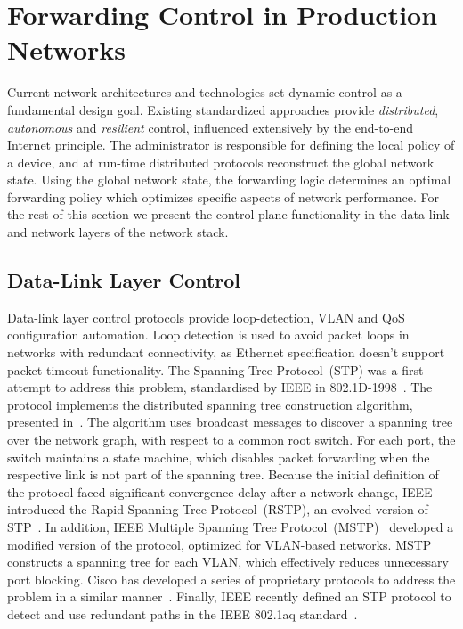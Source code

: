 \section{Forwarding Control in Production Networks} \label{sec:background:netcontrol}

Current network architectures and technologies set dynamic control as a
fundamental design goal.  Existing standardized approaches provide
\textit{distributed}, \textit{autonomous} and \textit{resilient} control,
influenced extensively by the end-to-end Internet principle. The administrator
is responsible for defining the local policy of a device, and at run-time
distributed protocols reconstruct the global network state.  Using the global
network state, the forwarding logic determines an optimal forwarding policy
which optimizes specific aspects of network performance.  For the rest of this
section we present the control plane functionality in the data-link and network
layers of the network stack. 

\subsection{Data-Link Layer Control}

Data-link layer control protocols provide loop-detection, VLAN and QoS
configuration automation. Loop detection is used to avoid packet loops in
networks with redundant connectivity, as Ethernet specification doesn't
support packet timeout functionality.  The Spanning Tree Protocol~(STP) was a
first attempt to address this problem, standardised by IEEE in
802.1D-1998~. The protocol implements the distributed
spanning tree construction algorithm, presented in~. The
algorithm uses broadcast messages to discover a spanning tree over the network
graph, with respect to a common root switch. For each port, the switch maintains
a state machine, which disables packet forwarding when the respective link is
not part of the spanning tree.  Because the initial definition of the protocol
faced significant convergence delay after a network change, IEEE introduced the
Rapid Spanning Tree Protocol~(RSTP), an evolved version of
STP~.  In addition,  IEEE Multiple Spanning Tree
Protocol~(MSTP)~ developed a modified version of the protocol,
optimized for VLAN-based networks. MSTP constructs a spanning tree for each
VLAN, which effectively  reduces unnecessary port blocking. Cisco has developed a
series of proprietary protocols to address the problem in a similar
manner~.  Finally, IEEE recently defined an STP protocol to
detect and use redundant paths in the IEEE 802.1aq standard~.

